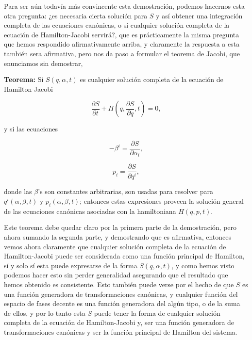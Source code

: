 \documentclass[a4paper,10pt]{article}
\numberwithin{equation}{section}
\newcommand{\teorema}{\textbf{Teorema: }}
\begin{document}
\vspace{.3cm}

Para ser aún todavía más convincente esta demostración, podemos hacernos 
esta otra pregunta: ¿es necesaria cierta solución para $S$ y así obtener 
una integración completa de las ecuaciones canónicas, o si cualquier 
solución completa de la ecuación de Hamilton-Jacobi servirá?, que es 
prácticamente la misma pregunta que hemos respondido afirmativamente 
arriba, y claramente la respuesta a esta también sera afirmativa, pero 
nos da paso a formular el teorema de Jacobi, que enunciamos sin 
demostrar, 

\begin{mdframed}[linewidth=2]
 
 \teorema Si $S(q,\alpha,t)$ es cualquier solución completa de la ecuación 
 de Hamilton-Jacobi
 
 \begin{equation}
 \frac{\partial S}{\partial t} + H\left(q,\frac{\partial S}{\partial q}, 
 t \right) = 0,
\end{equation}

y si las ecuaciones 

\begin{equation}
 - \beta^i = \frac{\partial S}{\partial \alpha_i},
\end{equation}

\begin{equation}
 p_i = \frac{\partial S}{\partial q^i},
\end{equation}
 
 donde las $\beta$'s son constantes arbitrarias, son usadas para resolver 
 para $q^i(\alpha,\beta,t)$ y $p_i(\alpha,\beta,t)$; entonces estas 
 expresiones proveen la solución general de las ecuaciones canónicas 
 asociadas con la hamiltoniana $H(q,p,t)$.  
\end{mdframed}

Este teorema debe quedar claro por la primera parte de la demostración, 
pero ahora sumando la segunda parte, y demostrando que es afirmativa, 
entonces vemos ahora claramente que cualquier solución completa de 
la ecuación de Hamilton-Jacobi puede ser considerada como una función 
principal de Hamilton, sí y solo sí esta puede expresarse de la forma 
$S(q,\alpha,t)$, y como hemos visto podemos hacer esto sin perder generalidad
asegurando que el resultado que hemos obtenido es consistente. Esto también
puede verse por el hecho de que $S$ es una función generadora de transformaciones 
canónicas, y cualquier función del espacio de fases decente es una función 
generadora del algún tipo, o de la suma de ellos, y por lo tanto esta $S$ 
puede tener la forma de cualquier solución completa de la ecuación 
de Hamilton-Jacobi y, ser una función generadora de transformaciones 
canónicas y ser la función principal de Hamilton del sistema.
\end{document}
